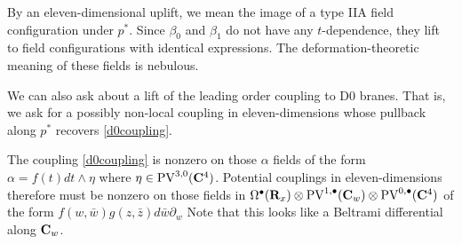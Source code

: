 \documentclass[11pt]{amsart}
\renewcommand{\PV}{\mathrm{PV}}
\begin{document}
By an eleven-dimensional uplift, we mean the image of a type IIA field configuration under $p^*$. Since $\beta_0$ and $\beta_1$ do not have any $t$-dependence, they lift to field configurations with identical expressions. The deformation-theoretic meaning of these fields is nebulous.

We can also ask about a lift of the leading order coupling to D0 branes. That is, we ask for a possibly non-local coupling in eleven-dimensions whose pullback along $p^*$ recovers \ref{d0coupling}. 

The coupling \ref{d0coupling} is nonzero on those $\alpha$ fields of the form $\alpha = f(t) dt \wedge \eta$ where $\eta\in \PV^{3,0} (\C^4)$. Potential couplings in eleven-dimensions therefore must be nonzero on those fields in $\Omega^\bullet (\R_x) \otimes \PV^{1,\bullet}(\C_w) \otimes \PV^{0,\bullet}(\C^4)$ of the form $f(w, \bar{w}) g(z, \bar{z}) d\bar{w}\partial_w$ Note that this looks like a Beltrami differential along $\mathbf{C}_w$. 
\end{document}

